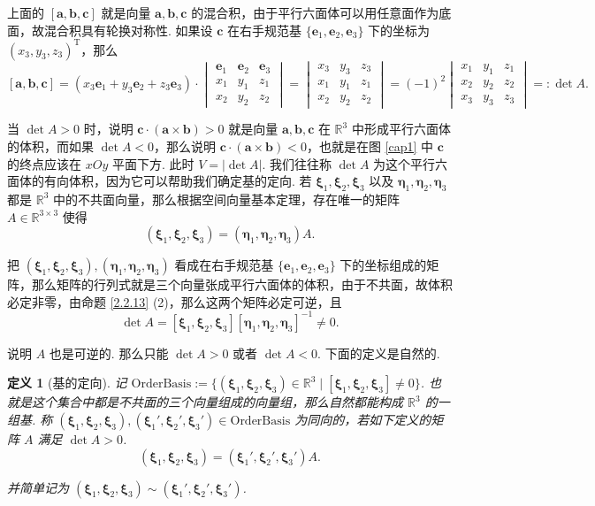 \documentclass[10pt,openany]{article}
\theoremstyle{thmstyle} %
\theoremstyle{defstyle} %
\newtheorem{definition}[theorem]{定义}
\theoremstyle{prostyle} %
\theoremstyle{exastyle}
\theoremstyle{remstyle}
\newcommand{\T}{^{\text{T}}}
\newcommand{\R}{\mathbb{R}}
\newcommand{\bmxi}{\bm{\xi}}
\newcommand{\bmeta}{\bm{\eta}}
\begin{document}
上面的 \( [\bm{a},\bm{b},\bm{c}] \) 就是向量 \( \bm{a}, \bm{b}, \bm{c} \) 的混合积，由于平行六面体可以用任意面作为底面，故混合积具有轮换对称性. 如果设 \( \bm{c} \) 在右手规范基 \( \{\bm{e}_1,\bm{e}_2,\bm{e}_3 \} \) 下的坐标为 \( (x_3,y_3,z_3)\T \)，那么
\[ [\bm{a},\bm{b},\bm{c}]= (x_3\bm{e}_1+y_3\bm{e}_2+z_3\bm{e}_3) \cdot \begin{vmatrix}
	\bm{e}_1 & \bm{e}_2 & \bm{e}_3 \\
	x_1 & y_1 & z_1 \\
	x_2 & y_2 & z_2
\end{vmatrix}= \begin{vmatrix}
x_3 & y_3 & z_3 \\
x_1 & y_1 & z_1 \\
x_2 & y_2 & z_2
\end{vmatrix}=(-1)^2\begin{vmatrix}
x_1 & y_1 & z_1 \\
x_2 & y_2 & z_2 \\
x_3 & y_3 & z_3 
\end{vmatrix}=:\det A. \]

当 \( \det A>0 \) 时，说明 \( \bm{c} \cdot (\bm{a} \times \bm{b})>0 \) 就是向量 \( \bm{a}, \bm{b}, \bm{c} \) 在 \( \R^3 \) 中形成平行六面体的体积，而如果 \( \det A<0 \)，那么说明 \( \bm{c} \cdot (\bm{a} \times \bm{b})<0 \)，也就是在图 \ref{cap1} 中 \( \bm{c} \) 的终点应该在 \( xOy \) 平面下方. 此时 \( V=|\det A| \). 我们往往称 \( \det A \) 为这个平行六面体的有向体积，因为它可以帮助我们确定基的定向. 若 \( \bmxi_1,\bmxi_2,\bmxi_3 \) 以及 \( \bmeta_1,\bmeta_2,\bmeta_3 \) 都是 \( \R^3 \) 中的不共面向量，那么根据空间向量基本定理，存在唯一的矩阵 \( A \in \R^{3 \times 3} \) 使得
\[ (\bmxi_1,\bmxi_2,\bmxi_3)=(\bmeta_1,\bmeta_2,\bmeta_3)A. \]

把 \( (\bmxi_1,\bmxi_2,\bmxi_3), (\bmeta_1,\bmeta_2,\bmeta_3) \) 看成在右手规范基 \( \{\bm{e}_1,\bm{e}_2,\bm{e}_3 \} \) 下的坐标组成的矩阵，那么矩阵的行列式就是三个向量张成平行六面体的体积，由于不共面，故体积必定非零，由命题 \ref{2.2.13} (2)，那么这两个矩阵必定可逆，且
\[ \det A= [\bmxi_1,\bmxi_2,\bmxi_3][\bmeta_1,\bmeta_2,\bmeta_3]^{-1} \neq 0. \]

说明 \( A \) 也是可逆的. 那么只能 \( \det A>0 \) 或者 \( \det A<0 \). 下面的定义是自然的.

\begin{definition}[基的定向] \label{2.3.1}
	记 \( \text{OrderBasis}:=\{ (\bmxi_1,\bmxi_2,\bmxi_3) \in \R^3 \mid [\bmxi_1,\bmxi_2,\bmxi_3] \neq 0 \} \). 也就是这个集合中都是不共面的三个向量组成的向量组，那么自然都能构成 \( \R^3 \) 的一组基. 称 \( (\bmxi_1,\bmxi_2,\bmxi_3), (\bmxi_1',\bmxi_2',\bmxi_3') \in \text{OrderBasis} \) 为同向的，若如下定义的矩阵 \( A \) 满足 \( \det A>0 \).
	\[ (\bmxi_1,\bmxi_2,\bmxi_3)= (\bmxi_1',\bmxi_2',\bmxi_3')A. \]
	
	并简单记为 \( (\bmxi_1,\bmxi_2,\bmxi_3) \sim (\bmxi_1',\bmxi_2',\bmxi_3') \).
\end{definition}
\end{document}

